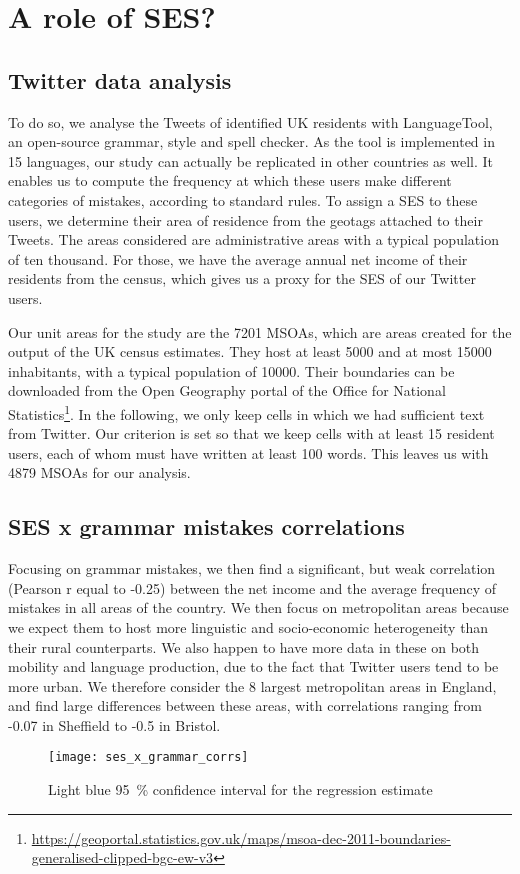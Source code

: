 \documentclass[../thesis.tex]{subfiles}
\begin{document}
\section{A role of SES?}

\subsection{Twitter data analysis}
To do so, we analyse the Tweets of identified UK residents with LanguageTool, an
open-source grammar, style and spell checker. As the tool is implemented in 15
languages, our study can actually be replicated in other countries as well. It enables
us to compute the frequency at which these users make different categories of mistakes,
according to standard rules. To assign a \ac{SES} to these users, we determine their area of
residence from the geotags attached to their Tweets. The areas considered are
administrative areas with a typical population of ten thousand. For those, we have the
average annual net income of their residents from the census, which gives us a proxy for the
\ac{SES} of our Twitter users.

Our unit areas for the study are the \SI{7201}{} \acp{MSOA}, which are areas created for
the output of the UK census estimates. They host at least \SI{5000}{} and at most
\SI{15000}{} inhabitants, with a typical population of \SI{10000}{}. Their boundaries
can be downloaded from the Open Geography portal of the Office for National
Statistics\footnote{\url{https://geoportal.statistics.gov.uk/maps/msoa-dec-2011-boundaries-generalised-clipped-bgc-ew-v3}}.
In the following, we only keep cells in which we had sufficient text from Twitter. Our
criterion is set so that we keep cells with at least 15 resident users, each of whom
must have written at least 100 words. This leaves us with \SI{4879}{} \acp{MSOA} for our
analysis.

\subsection{SES x grammar mistakes correlations}
Focusing on grammar mistakes, we then find a significant, but weak correlation (Pearson
r equal to -0.25) between the net income and the average frequency of mistakes in all
areas of the country. We then focus on metropolitan areas because we expect them to host
more linguistic and socio-economic heterogeneity than their rural counterparts. We also
happen to have more data in these on both mobility and language production, due to the
fact that Twitter users tend to be more urban. We therefore consider the 8 largest
metropolitan areas in England, and find large differences between these areas, with
correlations ranging from -0.07 in Sheffield to -0.5 in Bristol.
\begin{figure}[hb]
\centering
  \texttt{[image: ses\_x\_grammar\_corrs]}
  \caption{Light blue \SI{95}{\percent} confidence interval for the regression estimate}
  \label{fig:ses_x_grammar_corrs}
\end{figure}
\end{document}
